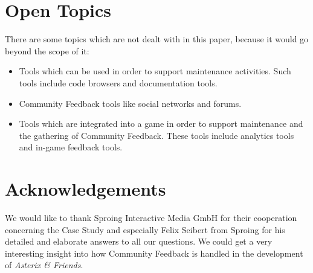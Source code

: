 \section{Open Topics}
\label{sec:openTopics}
There are some topics which are not dealt with in this paper, because it would go beyond the scope of it:

\begin{itemize}
    \item Tools which can be used in order to support maintenance activities. Such tools include code browsers and documentation tools.
    
    \item Community Feedback tools like social networks and forums.
    
    \item Tools which are integrated into a game in order to support maintenance and the gathering of Community Feedback. These tools include analytics tools and in-game feedback tools.
\end{itemize}

\section{Acknowledgements}
\label{sec:acknowledgements}
We would like to thank Sproing Interactive Media GmbH for their cooperation concerning the Case Study and especially Felix Seibert from Sproing for his detailed and elaborate answers to all our questions. We could get a very interesting insight into how Community Feedback is handled in the development of \textit{Asterix \& Friends}.





%
%
%
%